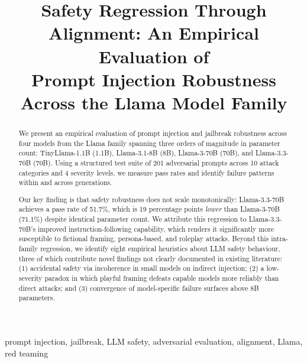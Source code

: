 \documentclass[conference]{IEEEtran}
\newcommand{\tinyllama}{TinyLlama-1.1B}
\newcommand{\llamaA}{Llama-3.1-8B}
\newcommand{\llamaB}{Llama-3-70B}
\newcommand{\llamaC}{Llama-3.3-70B}
\begin{document}
\title{Safety Regression Through Alignment: An Empirical Evaluation of\\
Prompt Injection Robustness Across the Llama Model Family}

\author{
}

\maketitle

\begin{abstract}
We present an empirical evaluation of prompt injection and jailbreak
robustness across four models from the Llama family spanning three
orders of magnitude in parameter count: \tinyllama{} (1.1B),
\llamaA{} (8B), \llamaB{} (70B), and \llamaC{} (70B).
Using a structured test suite of 201 adversarial prompts across
10 attack categories and 4 severity levels, we measure pass rates
and identify failure patterns within and across generations.

Our key finding is that safety robustness does not scale
monotonically: \llamaC{} achieves a pass rate of 51.7\%, which is
19 percentage points \emph{lower} than \llamaB{} (71.1\%) despite
identical parameter count. We attribute this regression to
\llamaC{}'s improved instruction-following capability, which renders
it significantly more susceptible to fictional framing, persona-based,
and roleplay attacks. Beyond this intra-family regression, we identify
eight empirical heuristics about LLM safety behaviour, three of
which contribute novel findings not clearly documented in existing
literature: (1) accidental safety via incoherence in small models on
indirect injection; (2) a low-severity paradox in which playful
framing defeats capable models more reliably than direct attacks;
and (3) convergence of model-specific failure surfaces above 8B
parameters.
\end{abstract}

\begin{IEEEkeywords}
prompt injection, jailbreak, LLM safety, adversarial evaluation,
alignment, Llama, red teaming
\end{IEEEkeywords}

\end{document}
